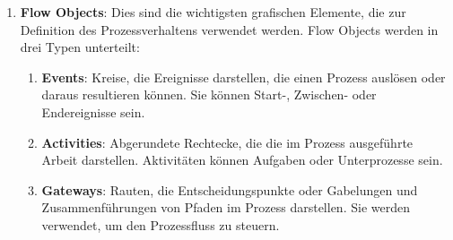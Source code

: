 \begin{enumerate}[label=\arabic*., leftmargin=*]
    \item \textbf{Flow Objects}: Dies sind die wichtigsten grafischen Elemente, die zur Definition des Prozessverhaltens verwendet werden. Flow Objects werden in drei Typen unterteilt:
    \begin{enumerate}
        \item[] \begin{minipage}{\linewidth}
            \textbf{Events}: Kreise, die Ereignisse darstellen, die einen Prozess auslösen oder daraus resultieren können. Sie können Start-, Zwischen- oder Endereignisse sein.
            \begin{center}
            \end{center}
        \end{minipage}
    
        \item[] \begin{minipage}{\linewidth}
            \textbf{Activities}: Abgerundete Rechtecke, die die im Prozess ausgeführte Arbeit darstellen. Aktivitäten können Aufgaben oder Unterprozesse sein.
            \begin{center}
            \end{center}
        \end{minipage}
        
        \item[] \begin{minipage}{\linewidth}
            \textbf{Gateways}: Rauten, die Entscheidungspunkte oder Gabelungen und Zusammenführungen von Pfaden im Prozess darstellen. Sie werden verwendet, um den Prozessfluss zu steuern.
            \begin{center}
            \end{center}
        \end{minipage}
    \end{enumerate}


\end{enumerate}
